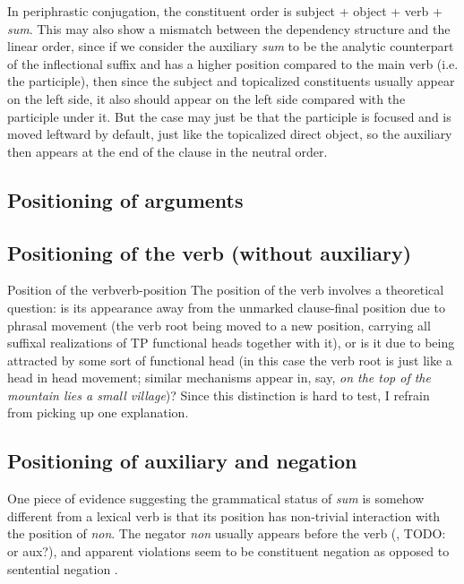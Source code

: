 \documentclass[a4paper, oneside]{report}
\newcommand*{\citesec}[1]{\S~{#1}}
\newcommand*{\citepage}[1]{p.~{#1}}
\newcommand{\form}[1]{\emph{#1}}
\begin{document}
In periphrastic conjugation,
the constituent order is subject + object + verb + \form{sum}.
This may also show a mismatch between the dependency structure and the linear order,
since if we consider the auxiliary \form{sum} to be 
the analytic counterpart of the inflectional suffix 
and has a higher position compared to the main verb (i.e. the participle),
then since the subject and topicalized constituents usually appear on the left side, 
it also should appear on the left side compared with the participle under it.
But the case may just be that the participle is focused and is moved leftward by default, 
just like the topicalized direct object,
so the auxiliary then appears at the end of the clause in the neutral order.

\subsection{Positioning of arguments}

\subsection{Positioning of the verb (without auxiliary)}

\begin{infobox}{Position of the verb}{verb-position}
    The position of the verb involves a theoretical question:
    is its appearance away from the unmarked clause-final position
    due to phrasal movement 
    (the verb root being moved to a new position, 
    carrying all suffixal realizations of 
    TP functional heads together with it),
    or is it due to being attracted by some sort of functional head
    (in this case the verb root is just like a head in head movement;
    similar mechanisms appear in, say, 
    \form{on the top of the mountain \emph{lies} a small village})?
    Since this distinction is hard to test, 
    I refrain from picking up one explanation.
\end{infobox}

\subsection{Positioning of auxiliary and negation}\label{sec:constituent-order.aux-neg}

One piece of evidence suggesting the grammatical status of \form{sum} 
is somehow different from a lexical verb 
is that its position has non-trivial interaction 
with the position of \form{non}.
The negator \form{non} usually appears before the verb 
(\citealt[\citesec{1.5}]{danckaert2017development}, TODO: or aux?),
and apparent violations seem to be constituent negation 
as opposed to sentential negation \citep[\citepage{43}]{danckaert2017development}.
\end{document}
